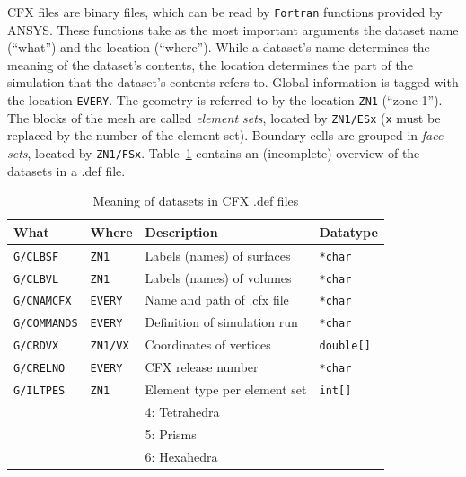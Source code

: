 \documentclass[a4paper,10pt]{article}
\begin{document}
CFX files are binary files, which can be read by \texttt{Fortran} functions
provided by ANSYS. These functions take as the most important arguments the
dataset name (``what'') and the location (``where''). While a dataset's name
determines the meaning of the dataset's contents, the location determines the
part of the simulation that the dataset's contents refers to. Global
information is tagged with the location \texttt{EVERY}. The geometry is
referred to by the location \texttt{ZN1} (``zone 1''). The blocks of the mesh
are called \emph{element sets}, located by \texttt{ZN1/ESx} (\texttt{x} must
be replaced by the number of the element set). Boundary cells are grouped in
\emph{face sets}, located by \texttt{ZN1/FSx}. Table~\ref{tab:cfx_def}
contains an (incomplete) overview of the datasets in a .def file.

\begin{table}
  \centering
  \caption{Meaning of datasets in CFX .def files}
  \label{tab:cfx_def}
  \begin{tabular}{llp{9cm}l}
    \textbf{What} & \textbf{Where} & \textbf{Description} & \textbf{Datatype} \\
    \hline\hline
    \texttt{G/CLBSF}    & \texttt{ZN1}     & Labels (names) of surfaces                    & \texttt{*char} \\ \hline
    \texttt{G/CLBVL}    & \texttt{ZN1}     & Labels (names) of volumes                     & \texttt{*char} \\ \hline
    \texttt{G/CNAMCFX}  & \texttt{EVERY}   & Name and path of .cfx file                    & \texttt{*char} \\ \hline
    \texttt{G/COMMANDS} & \texttt{EVERY}   & Definition of simulation run                  & \texttt{*char} \\ \hline
    \texttt{G/CRDVX}    & \texttt{ZN1/VX}  & Coordinates of vertices                       & \texttt{double[]} \\ \hline
    \texttt{G/CRELNO}   & \texttt{EVERY}   & CFX release number                            & \texttt{*char} \\ \hline
    \texttt{G/ILTPES}   & \texttt{ZN1}     & Element type per element set                  & \texttt{int[]} \\
                         &                   & 4: Tetrahedra & \\                                      
                         &                   & 5: Prisms     & \\                                      
                         &                   & 6: Hexahedra  & \\                                      

\end{tabular}
\end{table}
\end{document}
